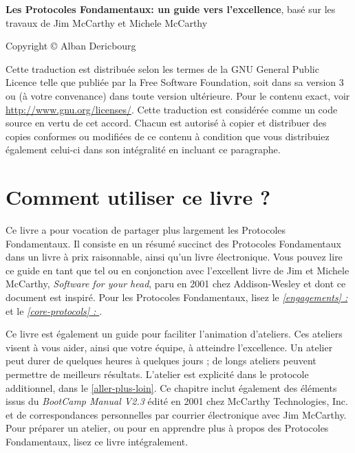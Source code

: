 \documentclass[paper=6in:9in,pagesize=pdftex,headinclude=on,footinclude=on,12pt]{scrbook}
\newcommand*{\numref}[1]{{\hyperref[{#1}]{\autoref*{#1}}}}
\newcommand*{\fullref}[1]{\textit{\hyperref[{#1}]{\autoref*{#1} : \nameref*{#1}}}}
\begin{document}
\begin{samepage}
	\noindent \textbf{Les Protocoles Fondamentaux: un guide vers l'excellence}, basé sur les travaux de Jim McCarthy et Michele McCarthy

	\noindent Copyright \copyright{} Alban Dericbourg

	\noindent Cette traduction est distribuée selon les termes de la GNU General Public Licence telle que publiée par la Free Software
	Foundation, soit dans sa version 3 ou (à votre convenance) dans toute version ultérieure. Pour le contenu exact, voir
	\url{http://www.gnu.org/licenses/}. Cette traduction est considérée comme un code source en vertu de cet accord. Chacun est autorisé
	à copier et distribuer des copies conformes ou modifiées de ce contenu à condition que vous distribuiez également celui-ci
	dans son intégralité en incluant ce paragraphe.
\end{samepage}

\mainmatter

\chapter{Comment utiliser ce livre ?} \label{utiliser-ce-livre}

Ce livre a pour vocation de partager plus largement les Protocoles Fondamentaux. Il consiste en un résumé succinct des
Protocoles Fondamentaux dans un livre à prix raisonnable, ainsi qu'un livre électronique. Vous pouvez lire ce guide en tant que
tel ou en conjonction avec l'excellent livre de Jim et Michele McCarthy, \emph{Software for your head}, paru en 2001
chez Addison-Wesley et dont ce document est inspiré. Pour les Protocoles Fondamentaux, lisez le \fullref{engagements}
et le \fullref{core-protocols}.

Ce livre est également un guide pour faciliter l'animation d'ateliers. Ces ateliers visent à vous aider, ainsi que
votre équipe, à atteindre l'excellence. Un atelier peut durer de quelques heures à quelques jours ; de longs ateliers
peuvent permettre de meilleurs résultats. L'atelier est explicité dans le protocole additionnel, 
dans le \numref{aller-plus-loin}. Ce chapitre inclut également des éléments issus du \emph{BootCamp Manual V2.3} édité en
2001 chez McCarthy Technologies, Inc. et de correspondances personnelles par courrier électronique avec Jim McCarthy. Pour
préparer un atelier, ou pour en apprendre plus à propos des Protocoles Fondamentaux, lisez ce livre intégralement.
\end{document}
